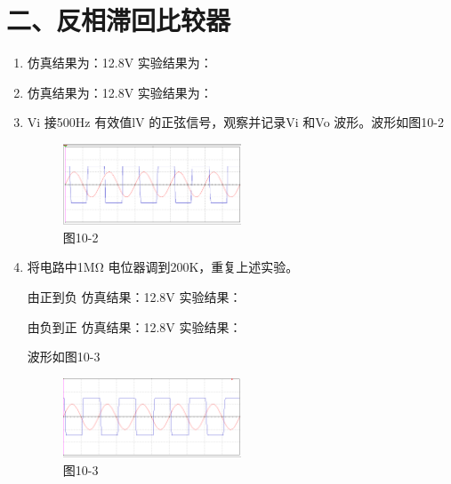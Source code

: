 \documentclass[a4paper,10pt,notitlepage]{article}
\begin{document}
	\section*{二、反相滞回比较器}
	\begin{enumerate}
		\item 仿真结果为：12.8V \qquad\qquad  实验结果为：
		\item 仿真结果为：12.8V \qquad\qquad  实验结果为：
		\item Vi 接500Hz 有效值lV 的正弦信号，观察并记录Vi 和Vo 波形。波形如图10-2
		\begin{figure}[h]
			\centering
			\includegraphics[width=0.5\textwidth]{3.png}
			\caption*{图10-2}
		\end{figure}
		\item 将电路中1MΩ 电位器调到200K，重复上述实验。\par
		由正到负 \qquad 仿真结果：12.8V   \qquad\qquad 实验结果：\par 
		由负到正 \qquad 仿真结果：12.8V   \qquad\qquad 实验结果：\par
		波形如图10-3
		\begin{figure}[h]
			\centering
			\includegraphics[width=0.5\textwidth]{4.png}
			\caption*{图10-3}
		\end{figure}
	\end{enumerate}
\end{document}
